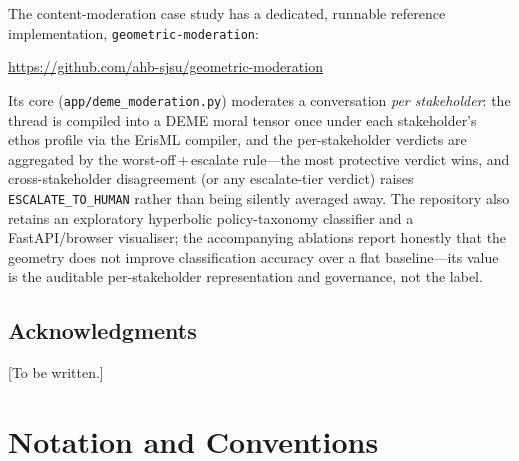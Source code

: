 \documentclass[12pt,letterpaper,twoside,openright]{book}
\theoremstyle{plain}
\theoremstyle{definition}
\theoremstyle{remark}
\begin{document}
The content-moderation case study has a dedicated, runnable reference implementation, \texttt{geometric-moderation}:
\begin{center}
\url{https://github.com/ahb-sjsu/geometric-moderation}
\end{center}
Its core (\texttt{app/deme\_moderation.py}) moderates a conversation \emph{per stakeholder}: the thread is compiled into a DEME moral tensor once under each stakeholder's ethos profile via the ErisML compiler, and the per-stakeholder verdicts are aggregated by the worst-off\,+\,escalate rule---the most protective verdict wins, and cross-stakeholder disagreement (or any escalate-tier verdict) raises \texttt{ESCALATE\_TO\_HUMAN} rather than being silently averaged away. The repository also retains an exploratory hyperbolic policy-taxonomy classifier and a FastAPI/browser visualiser; the accompanying ablations report honestly that the geometry does not improve classification accuracy over a flat baseline---its value is the auditable per-stakeholder representation and governance, not the label.

\section*{Acknowledgments}

[To be written.]

\cleardoublepage

\tableofcontents
\cleardoublepage

\listoffigures
\cleardoublepage
\listoftables
\cleardoublepage

\chapter{Notation and Conventions}
\end{document}
